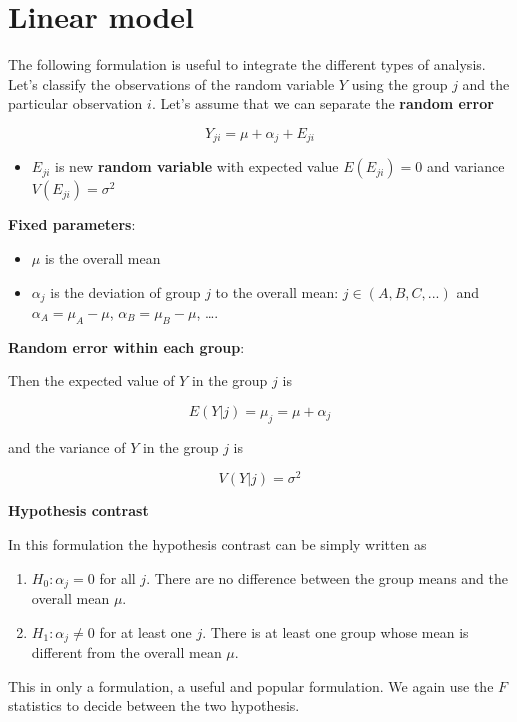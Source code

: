 \documentclass[
]{book}
\providecommand{\tightlist}{%
  \setlength{\itemsep}{0pt}\setlength{\parskip}{0pt}}
\begin{document}
\hypertarget{linear-model}{%
\section{Linear model}\label{linear-model}}

The following formulation is useful to integrate the different types of analysis. Let's classify the observations of the random variable \(Y\) using the group \(j\) and the particular observation \(i\). Let's assume that we can separate the \textbf{random error}

\[Y_{ji} = \mu + \alpha_j +E_{ji}\]

\begin{itemize}
\tightlist
\item
  \(E_{ji}\) is new \textbf{random variable} with expected value \(E(E_{ji})=0\) and variance \(V(E_{ji})=\sigma^2\)
\end{itemize}

\textbf{Fixed parameters}:

\begin{itemize}
\tightlist
\item
  \(\mu\) is the overall mean
\item
  \(\alpha_j\) is the deviation of group \(j\) to the overall mean: \(j \in (A,B, C, ...)\) and \(\alpha_A=\mu_A-\mu\), \(\alpha_B=\mu_B-\mu\), \ldots.
\end{itemize}

\textbf{Random error within each group}:

Then the expected value of \(Y\) in the group \(j\) is

\[E(Y| j)=\mu_j=\mu + \alpha_j\]

and the variance of \(Y\) in the group \(j\) is

\[V(Y| j)=\sigma^2\]

\textbf{Hypothesis contrast}

In this formulation the hypothesis contrast can be simply written as

\begin{enumerate}
\def\labelenumi{\alph{enumi}.}
\item
  \(H_0:\alpha_j=0\) for all \(j\). There are no difference between the group means and the overall mean \(\mu\).
\item
  \(H_1:\alpha_j\neq0\) for at least one \(j\). There is at least one group whose mean is different from the overall mean \(\mu\).
\end{enumerate}

This in only a formulation, a useful and popular formulation. We again use the \(F\) statistics to decide between the two hypothesis.
\end{document}
